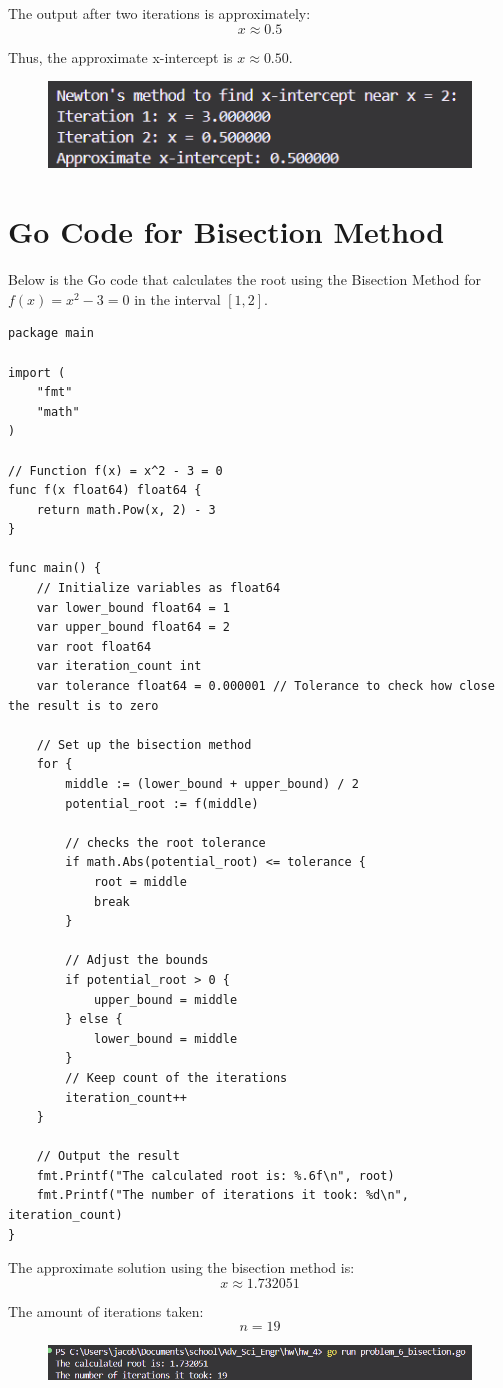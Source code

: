 \documentclass[11pt]{article}
\begin{document}
The output after two iterations is approximately:
\[
x \approx 0.5
\]

Thus, the approximate x-intercept is \( x \approx 0.50 \).

\begin{figure}[!ht]
    \centering
    \includegraphics[width= 1 \textwidth]{images/x_2.png}
    \label{fig:1}
  \end{figure}
  \FloatBarrier

  \section{Go Code for Bisection Method}

Below is the Go code that calculates the root using the Bisection Method for \( f(x) = x^2 - 3 = 0 \) in the interval \( [1, 2] \).

\begin{verbatim}
package main

import (
	"fmt"
	"math"
)

// Function f(x) = x^2 - 3 = 0
func f(x float64) float64 {
	return math.Pow(x, 2) - 3
}

func main() {
	// Initialize variables as float64
	var lower_bound float64 = 1
	var upper_bound float64 = 2
	var root float64
	var iteration_count int
	var tolerance float64 = 0.000001 // Tolerance to check how close the result is to zero

	// Set up the bisection method
	for {
		middle := (lower_bound + upper_bound) / 2
		potential_root := f(middle)

		// checks the root tolerance
		if math.Abs(potential_root) <= tolerance {
			root = middle
			break
		}

		// Adjust the bounds
		if potential_root > 0 {
			upper_bound = middle
		} else {
			lower_bound = middle
		}
		// Keep count of the iterations
		iteration_count++
	}

	// Output the result
	fmt.Printf("The calculated root is: %.6f\n", root)
	fmt.Printf("The number of iterations it took: %d\n", iteration_count)
}
\end{verbatim}

  The approximate solution using the bisection method is:
\[
x \approx 1.732051
\]

The amount of iterations taken:
\[
n = 19
\]

  \begin{figure}[!ht]
    \centering
    \includegraphics[width= 1 \textwidth]{images/x_3.png}
    \label{fig:1}
  \end{figure}
  \FloatBarrier
\end{document}
